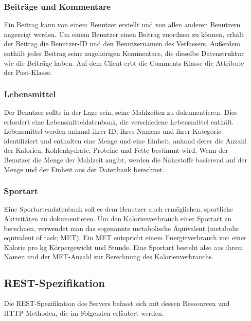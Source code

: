 	\subsubsection{Beiträge und Kommentare}
	Ein Beitrag kann von einem Benutzer erstellt und von allen anderen Benutzern angezeigt werden. Um einem Benutzer einen Beitrag zuordnen zu können, erhält der Beitrag die Benutzer-ID und den Benutzernamen des Verfassers. Außerdem enthält jeder Beitrag seine zugehörigen Kommentare, die dieselbe Datenstruktur wie die Beiträge haben. Auf dem Client erbt die Comments-Klasse die Attribute der Post-Klasse. 
	
	\subsubsection{Lebensmittel}
	Der Benutzer sollte in der Lage sein, seine Mahlzeiten zu dokumentieren. Dies erfordert eine Lebensmitteldatenbank, die verschiedene Lebensmittel enthält. Lebensmittel werden anhand ihrer ID, ihres Namens und ihrer Kategorie identifiziert und enthalten eine Menge und eine Einheit, anhand derer die Anzahl der Kalorien, Kohlenhydrate, Proteine und Fette bestimmt wird. Wenn der Benutzer die Menge der Mahlzeit angibt, werden die Nährstoffe basierend auf der Menge und der Einheit aus der Datenbank berechnet. 
	
	\subsubsection{Sportart}
	Eine Sportartendatenbank soll es dem Benutzer auch ermöglichen, sportliche Aktivitäten zu dokumentieren. Um den Kalorienverbrauch einer Sportart zu berechnen, verwendet man das sogenannte metabolische Äquivalent (metabolic equivalent of task; MET). Ein MET entspricht einem Energieverbrauch von einer Kalorie pro kg Körpergewicht und Stunde. Eine Sportart besteht also aus ihrem Namen und der MET-Anzahl zur Berechnung des Kalorienverbrauchs.
	
		\newpage
\subsection{REST-Spezifikation}
	Die REST-Spezifikation des Servers befasst sich mit dessen Ressourcen und HTTP-Methoden, die im Folgenden erläutert werden.
